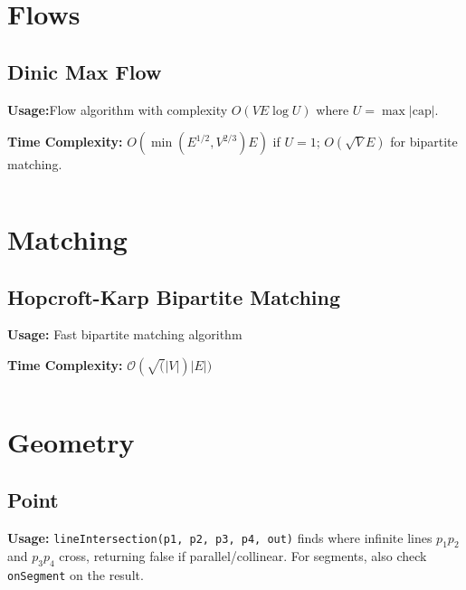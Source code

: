 \section{Flows}
  \subsection{Dinic Max Flow}
    \par \textbf{Usage:}Flow algorithm with complexity $O(VE\log U)$ where $U = \max |\text{cap}|$.
    \par \textbf{Time Complexity:} $O(\min(E^{1/2}, V^{2/3})E)$ if $U = 1$; $O(\sqrt{V}E)$ for bipartite matching.
    \inputminted{cpp}{library/flows/dinic.hpp}

\section{Matching}

  \subsection{Hopcroft-Karp Bipartite Matching}
    \par \textbf{Usage:} Fast bipartite matching algorithm
    \par \textbf{Time Complexity:} $\mathcal{O}(\sqrt(|V|) |E|)$
    \inputminted{cpp}{library/matching/hopcroft_karp.hpp}

\section{Geometry}
  \subsection{Point}
    \par \textbf{Usage:} \texttt{lineIntersection(p1, p2, p3, p4, out)} finds where infinite lines $p_1p_2$ and $p_3p_4$ cross, returning false if parallel/collinear. For segments, also check \texttt{onSegment} on the result.
    \newline
    \inputminted{cpp}{library/geo/point.hpp}
